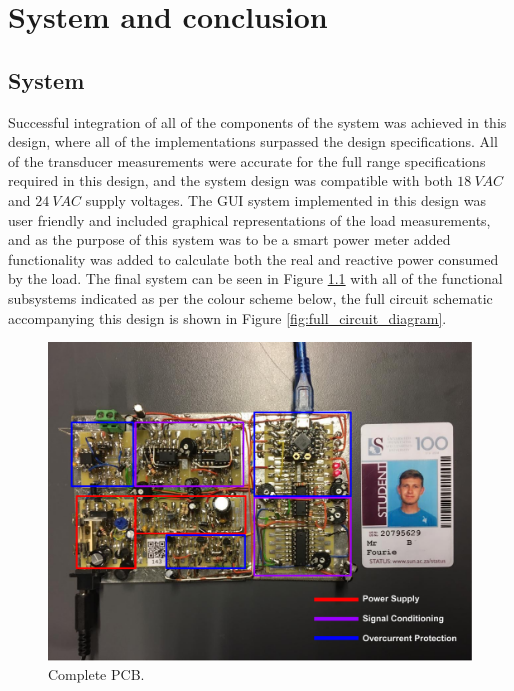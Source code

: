 \chapter{System and conclusion}
\vspace{-5mm}
\section{System}
Successful integration of all of the components of the system was achieved in this design, where all of the implementations surpassed the design specifications. All of the transducer measurements were accurate for the full range specifications required in this design, and the system design was compatible with both $\SI{18}{VAC}$ and $\SI{24}{VAC}$ supply voltages. The GUI system implemented in this design was user friendly and included graphical representations of the load measurements, and as the purpose of this system was to be a smart power meter added functionality was added to calculate both the real and reactive power consumed by the load. The final system can be seen in Figure \ref{fig:PCB} with all of the functional subsystems indicated as per the colour scheme below, the full circuit schematic accompanying this design is shown in Figure \ref{fig:full_circuit_diagram}. 

\begin{figure}[ht]
    \centering
    \includegraphics[width=0.8\linewidth]{./Figures/PCB.pdf}
    \caption{Complete PCB. } \label{fig:PCB}
\end{figure}

